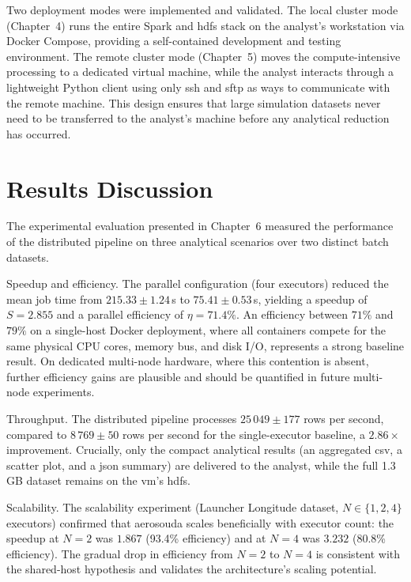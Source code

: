 Two deployment modes were implemented and validated.  The local cluster mode
(Chapter~4) runs the entire Spark and \gls{hdfs} stack on the analyst's workstation via
Docker Compose, providing a self-contained development and testing environment.  The
remote cluster mode (Chapter~5) moves the compute-intensive processing to a
dedicated virtual machine, while the analyst interacts through a lightweight Python client
using only \gls{ssh} and \gls{sftp} as ways to communicate with the remote machine.  
This design ensures that large simulation datasets never need to be transferred to the
analyst's machine before any analytical reduction has occurred.

\section{Results Discussion}
\label{sec:conc-discussion}

The experimental evaluation presented in Chapter~6 measured the performance of the
distributed pipeline on three analytical scenarios over two distinct batch datasets.

Speedup and efficiency.
The parallel configuration (four executors) reduced the mean job time from
$215.33 \pm 1.24$\,s to $75.41 \pm 0.53$\,s, yielding a speedup of $S = 2.855$ and a
parallel efficiency of $\eta = 71.4\%$.  An efficiency between $71\%$ and $79\%$ on a single-host Docker
deployment, where all containers compete for the same physical CPU cores, memory bus, and
disk I/O, represents a strong baseline result.  On dedicated multi-node hardware, where
this contention is absent, further efficiency gains are plausible and should be quantified
in future multi-node experiments.

Throughput.
The distributed pipeline processes $25\,049 \pm 177$ rows per second, compared to
$8\,769 \pm 50$ rows per second for the single-executor baseline, a $2.86\times$
improvement.  Crucially, only the compact analytical results (an aggregated \gls{csv}, a
scatter plot, and a \gls{json} summary) are delivered to the analyst, while the full
1.3\,GB dataset remains on the \gls{vm}'s \gls{hdfs}.

Scalability.
The scalability experiment (Launcher Longitude dataset, $N \in \{1, 2, 4\}$ executors)
confirmed that \gls{aerosouda} scales beneficially with executor count: the speedup at
$N=2$ was $1.867$ (93.4\% efficiency) and at $N=4$ was $3.232$ (80.8\% efficiency).
The gradual drop in efficiency from $N=2$ to $N=4$ is consistent with the shared-host
hypothesis and validates the architecture's scaling potential.


